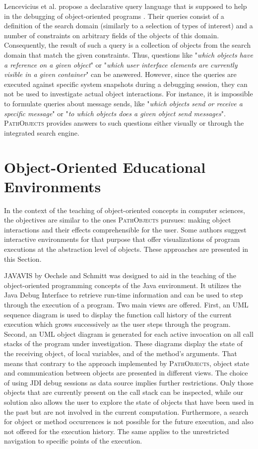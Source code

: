 Lencevicius et al. propose a declarative query language that is supposed to help in the debugging of object-oriented programs \cite{lencevicius_query-based_1997, guerraoui_dynamic_1999}.
Their queries consist of a definition of the search domain (similarly to a selection of types of interest) and a number of constraints on arbitrary fields of the objects of this domain.
Consequently, the result of such a query is a collection of objects from the search domain that match the given constraints.
Thus, questions like "\textit{which objects have a reference on a given object}" or "\textit{which user interface elements are currently visible in a given container}" can be answered.
However, since the queries are executed against specific system snapshots during a debugging session, they can not be used to investigate actual object interactions.
For instance, it is impossible to formulate queries about message sends, like "\textit{which objects send or receive a specific message}" or "\textit{to which objects does a given object send messages}".
\textsc{PathObjects} provides answers to such questions either visually or through the integrated search engine.

\section{Object-Oriented Educational Environments}
\label{s:RelatedEducational}
In the context of the teaching of object-oriented concepts in computer sciences, the objectives are similar to the ones \textsc{PathObjects} pursues: making object interactions and their effects comprehensible for the user.
Some authors suggest interactive environments for that purpose that offer visualizations of program executions at the abstraction level of objects.
These approaches are presented in this Section.

\textsc{JAVAVIS} by Oechsle and Schmitt \cite{diehl_javavis:_2002} was designed to aid in the teaching of the object-oriented programming concepts of the Java environment.
It utilizes the Java Debug Interface to retrieve run-time information and can be used to step through the execution of a program.
Two main views are offered.
First, an UML sequence diagram is used to display the function call history of the current execution which grows successively as the user steps through the program.
Second, an UML object diagram is generated for each active invocation on all call stacks of the program under investigation.
These diagrams display the state of the receiving object, of local variables, and of the method's arguments.
That means that contrary to the approach implemented by \textsc{PathObjects}, object state and communication between objects are presented in different views.
The choice of using JDI debug sessions as data source implies further restrictions.
Only those objects that are currently present on the call stack can be inspected, while our solution also allows the user to explore the state of objects that have been used in the past but are not involved in the current computation.
Furthermore, a search for object or method occurrences is not possible for the future execution, and also not offered for the execution history.
The same applies to the unrestricted navigation to specific points of the execution.

